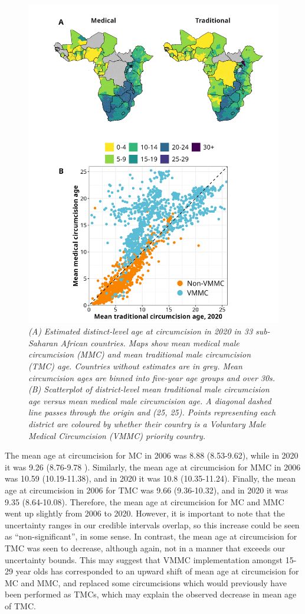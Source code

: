 \documentclass{article}
\begin{document}
\begin{figure}[H]
    \centering
    \includegraphics[width=.9\linewidth]
    {figures/paper/04_map_plot_mean_circ_age.png}
    \caption{\emph{(A) Estimated distinct-level age at circumcision in 2020 in 33 sub-Saharan African countries. Maps show mean medical male circumcision (MMC) and mean traditional male circumcision (TMC) age. Countries without estimates are in grey. Mean circumcision ages are binned into five-year age groups and over 30s. (B) Scatterplot of district-level mean traditional male circumcision age versus mean medical male circumcision age. A diagonal dashed line passes through the origin and (25, 25). Points representing each district are coloured by whether their country is a Voluntary Male Medical Circumcision (VMMC) priority country.}}
\end{figure}

The mean age at circumcision for MC in 2006 was 8.88 (8.53-9.62), while in 2020 it was 9.26 (8.76-9.78
). Similarly, the mean age at circumcision for MMC in 2006 was 10.59 (10.19-11.38), and in 2020 it was
10.8 (10.35-11.24). Finally, the mean age at circumcision in 2006 for TMC was 9.66 (9.36-10.32), and in
2020 it was 9.35 (8.64-10.08). 
Therefore, the mean age at circumcision for MC and MMC went up slightly from
2006 to 2020. However, it is important to note that the uncertainty ranges in our credible intervals overlap,
so this increase could be seen as “non-significant”, in some sense. In contrast, the mean age at circumcision
for TMC was seen to decrease, although again, not in a manner that exceeds our uncertainty bounds. This may
suggest that VMMC implementation amongst 15-29 year olds has corresponded to an upward shift of mean
age at circumcision for MC and MMC, and replaced some circumcisions which would previously have been
performed as TMCs, which may explain the observed decrease in mean age of TMC.
\end{document}
